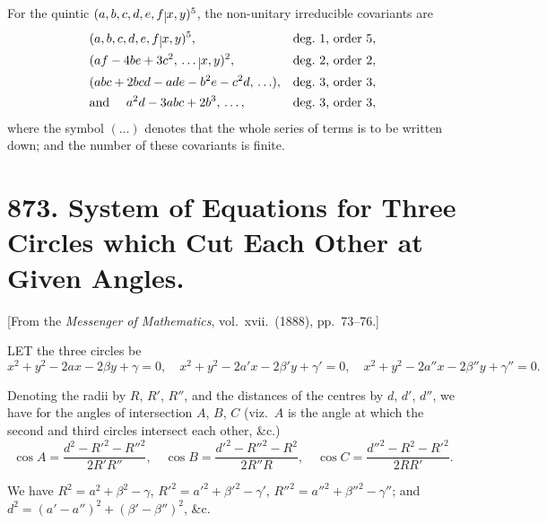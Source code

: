 \documentclass[12pt,a4paper]{article}
\theoremstyle{plain}
\begin{document}
\medskip\noindent
For the quintic $(a, b, c, d, e, f\,\raisebox{-.5ex}{$\hspace{-.2em}\vert\hspace{-.2em}$}\,x, y)^{5}$, the non-unitary irreducible covariants are
\begin{align*}
&(a, b, c, d, e, f\,\raisebox{-.5ex}{$\hspace{-.2em}\vert\hspace{-.2em}$}\,x, y)^{5}, && \text{deg.\ 1, order 5}, \\
&(af - 4be + 3c^{2},\,\ldots\,\raisebox{-.5ex}{$\hspace{-.2em}\vert\hspace{-.2em}$}\,x, y)^{2}, && \text{deg.\ 2, order 2}, \\
&(abc + 2bcd - ade - b^{2}e - c^{2}d,\,\ldots), && \text{deg.\ 3, order 3}, \\
&\text{and } \quad a^{2}d - 3abc + 2b^{3},\,\ldots, && \text{deg.\ 3, order 3},
\end{align*}
where the symbol $(\ldots)$ denotes that the whole series of terms is to be written down; and the number of these covariants is finite.

\newpage
\section[873]{873. System of Equations for Three Circles which Cut Each Other at Given Angles.}
\label{sec:873}

[From the \textit{Messenger of Mathematics}, vol.\ xvii.\ (1888), pp.\ 73--76.]

\medskip\noindent
LET the three circles be
\[
x^{2} + y^{2} - 2ax - 2\beta y + \gamma = 0, \quad
x^{2} + y^{2} - 2a'x - 2\beta' y + \gamma' = 0, \quad
x^{2} + y^{2} - 2a''x - 2\beta'' y + \gamma'' = 0.
\]

Denoting the radii by $R$, $R'$, $R''$, and the distances of the centres by $d$, $d'$, $d''$, we have for the angles of intersection $A$, $B$, $C$ (viz.\ $A$ is the angle at which the second and third circles intersect each other, \&c.)
\[
\cos A = \frac{d^{2} - R'^{2} - R''^{2}}{2R'R''}, \quad
\cos B = \frac{d'^{2} - R''^{2} - R^{2}}{2R''R}, \quad
\cos C = \frac{d''^{2} - R^{2} - R'^{2}}{2RR'}.
\]

We have $R^{2} = a^{2} + \beta^{2} - \gamma$, $R'^{2} = a'^{2} + \beta'^{2} - \gamma'$, $R''^{2} = a''^{2} + \beta''^{2} - \gamma''$; and $d^{2} = (a' - a'')^{2} + (\beta' - \beta'')^{2}$, \&c.
\end{document}
